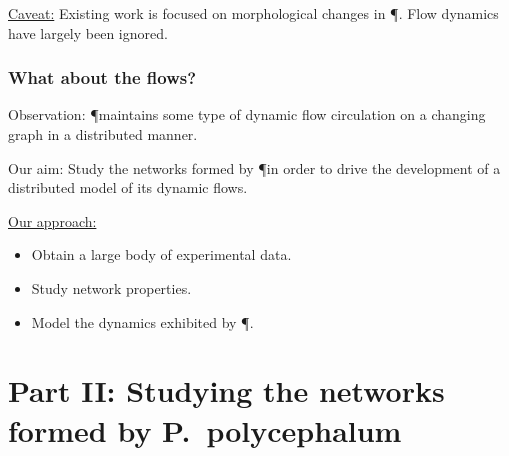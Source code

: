 \documentclass[	hyperref={pdfpagelabels=false}, xcolor=dvipsnames,
		11pt]{beamer}
\begin{document}
\begin{frame}
\begin{columns}
\begin{column}{5cm}
\begin{overprint}
	\end{overprint}
	\end{column}
	\end{columns}
	\vspace{-0.5cm}
	\begin{alertblock}{\underline{Caveat:}}
		Existing work is focused on morphological changes in \P. Flow dynamics have largely been ignored.
	\end{alertblock}
\end{frame}

\begin{frame}
    \frametitle{What about the flows?} 

    \begin{block}{Observation:}
    	\P maintains some type of dynamic flow circulation on a changing graph in a distributed manner.
    \end{block}

     \begin{block}{Our aim:}
    	Study the networks formed by \P in order to drive the development of a distributed model of its dynamic flows.
    \end{block}

	\begin{alertblock}{\underline{Our approach:}}
		\begin{itemize}
			\item Obtain a large body of experimental data.
			\item Study network properties.
			\item Model the dynamics exhibited by \P.
		\end{itemize}
	\end{alertblock}
\end{frame}

\section{Part II: Studying the networks formed by P.~polycephalum}
\end{document}
